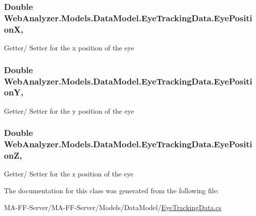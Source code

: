 \subsubsection[{Eye\+Position\+X}]{\setlength{\rightskip}{0pt plus 5cm}Double Web\+Analyzer.\+Models.\+Data\+Model.\+Eye\+Tracking\+Data.\+Eye\+Position\+X\hspace{0.3cm}{\ttfamily [get]}, {\ttfamily [set]}}\label{class_web_analyzer_1_1_models_1_1_data_model_1_1_eye_tracking_data_a872295614640947c4599c118311be629}


Getter/ Setter for the x position of the eye 

\hypertarget{class_web_analyzer_1_1_models_1_1_data_model_1_1_eye_tracking_data_a4c90dacc2660f530e239c2dca2dddaea}{}
\subsubsection[{Eye\+Position\+Y}]{\setlength{\rightskip}{0pt plus 5cm}Double Web\+Analyzer.\+Models.\+Data\+Model.\+Eye\+Tracking\+Data.\+Eye\+Position\+Y\hspace{0.3cm}{\ttfamily [get]}, {\ttfamily [set]}}\label{class_web_analyzer_1_1_models_1_1_data_model_1_1_eye_tracking_data_a4c90dacc2660f530e239c2dca2dddaea}


Getter/ Setter for the y position of the eye 

\hypertarget{class_web_analyzer_1_1_models_1_1_data_model_1_1_eye_tracking_data_a37767ef6afd8e74c124fd0683015b4e5}{}
\subsubsection[{Eye\+Position\+Z}]{\setlength{\rightskip}{0pt plus 5cm}Double Web\+Analyzer.\+Models.\+Data\+Model.\+Eye\+Tracking\+Data.\+Eye\+Position\+Z\hspace{0.3cm}{\ttfamily [get]}, {\ttfamily [set]}}\label{class_web_analyzer_1_1_models_1_1_data_model_1_1_eye_tracking_data_a37767ef6afd8e74c124fd0683015b4e5}


Getter/ Setter for the z position of the eye 



The documentation for this class was generated from the following file\+:\begin{DoxyCompactItemize}
\item 
M\+A-\/\+F\+F-\/\+Server/\+M\+A-\/\+F\+F-\/\+Server/\+Models/\+Data\+Model/\hyperlink{_eye_tracking_data_8cs}{Eye\+Tracking\+Data.\+cs}\end{DoxyCompactItemize}
